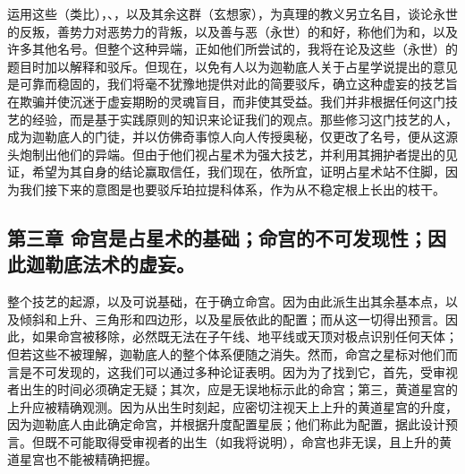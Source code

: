 运用这些（类比），、，以及其余这群（玄想家），为真理的教义另立名目，谈论永世的反叛，善势力对恶势力的背叛，以及善与恶（永世）的和好，称他们为和，以及许多其他名号。但整个这种异端，正如他们所尝试的，我将在论及这些（永世）的题目时加以解释和驳斥。但现在，以免有人以为迦勒底人关于占星学说提出的意见是可靠而稳固的，我们将毫不犹豫地提供对此的简要驳斥，确立这种虚妄的技艺旨在欺骗并使沉迷于虚妄期盼的灵魂盲目，而非使其受益。我们并非根据任何这门技艺的经验，而是基于实践原则的知识来论证我们的观点。那些修习这门技艺的人，成为迦勒底人的门徒，并以仿佛奇事惊人向人传授奥秘，仅更改了名号，便从这源头炮制出他们的异端。但由于他们视占星术为强大技艺，并利用其拥护者提出的见证，希望为其自身的结论赢取信任，我们现在，依所宜，证明占星术站不住脚，因为我们接下来的意图是也要驳斥珀拉提科体系，作为从不稳定根上长出的枝干。\par


\subsection{第三章 命宫是占星术的基础；命宫的不可发现性；因此迦勒底法术的虚妄。}

整个技艺的起源，以及可说基础，在于确立命宫。因为由此派生出其余基本点，以及倾斜和上升、三角形和四边形，以及星辰依此的配置；而从这一切得出预言。因此，如果命宫被移除，必然既无法在子午线、地平线或天顶对极点识别任何天体；但若这些不被理解，迦勒底人的整个体系便随之消失。然而，命宫之星标对他们而言是不可发现的，这我们可以通过多种论证表明。因为为了找到它，首先，受审视者出生的时间必须确定无疑；其次，应是无误地标示此的命宫；第三，黄道星宫的上升应被精确观测。因为从出生时刻起，应密切注视天上上升的黄道星宫的升度，因为迦勒底人由此确定命宫，并根据升度配置星辰；他们称此为配置，据此设计预言。但既不可能取得受审视者的出生（如我将说明），命宫也非无误，且上升的黄道星宫也不能被精确把握。\par


